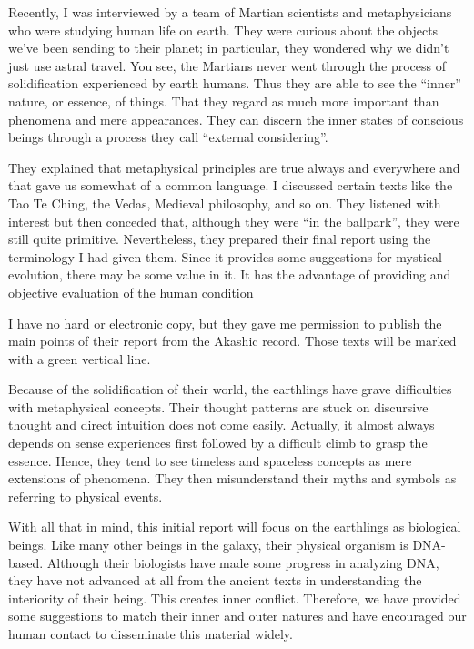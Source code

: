 Recently, I was interviewed by a team of Martian scientists and metaphysicians who were studying human life on earth. They were curious about the objects we've been sending to their planet; in particular, they wondered why we didn't just use astral travel. You see, the Martians never went through the process of solidification experienced by earth humans. Thus they are able to see the ``inner'' nature, or essence, of things. That they regard as much more important than phenomena and mere appearances. They can discern the inner states of conscious beings through a process they call ``external considering''.

They explained that metaphysical principles are true always and everywhere and that gave us somewhat of a common language. I discussed certain texts like the Tao Te Ching, the Vedas, Medieval philosophy, and so on. They listened with interest but then conceded that, although they were ``in the ballpark'', they were still quite primitive. Nevertheless, they prepared their final report using the terminology I had given them. Since it provides some suggestions for mystical evolution, there may be some value in it. It has the advantage of providing and objective evaluation of the human condition

I have no hard or electronic copy, but they gave me permission to publish the main points of their report from the Akashic record. Those texts will be marked with a green vertical line.

\begin{quotationx}
Because of the solidification of their world, the earthlings have grave difficulties with metaphysical concepts. Their thought patterns are stuck on discursive thought and direct intuition does not come easily. Actually, it almost always depends on sense experiences first followed by a difficult climb to grasp the essence. Hence, they tend to see timeless and spaceless concepts as mere extensions of phenomena. They then misunderstand their myths and symbols as referring to physical events.

With all that in mind, this initial report will focus on the earthlings as biological beings. Like many other beings in the galaxy, their physical organism is DNA-based. Although their biologists have made some progress in analyzing DNA, they have not advanced at all from the ancient texts in understanding the interiority of their being. This creates inner conflict. Therefore, we have provided some suggestions to match their inner and outer natures and have encouraged our human contact to disseminate this material widely.
\end{quotationx}


